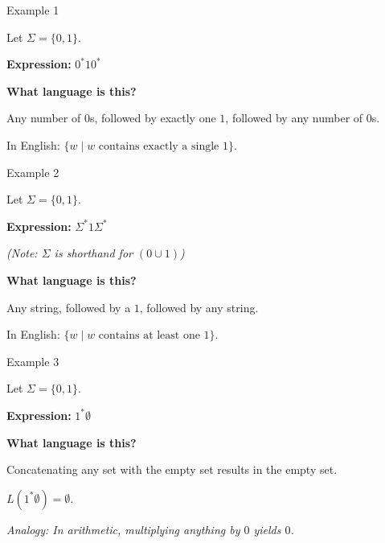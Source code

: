 \documentclass[10pt,aspectratio=169]{beamer}
\begin{document}
\begin{frame}{Example 1}

Let $\Sigma = \{0, 1\}$.

\vspace{1em}

\textbf{Expression:} $0^* 1 0^*$

\vspace{1em}

\textbf{What language is this?}

\pause
\vspace{0.5em}
Any number of $0$s, followed by exactly one $1$, followed by any number of $0$s.

\vspace{1em}
In English: $\{w \mid w \text{ contains exactly a single } 1\}$.

\end{frame}

\begin{frame}{Example 2}

Let $\Sigma = \{0, 1\}$.

\vspace{1em}

\textbf{Expression:} $\Sigma^* 1 \Sigma^*$

\textit{(Note: $\Sigma$ is shorthand for $(0 \cup 1)$)}

\vspace{1em}

\textbf{What language is this?}

\pause
\vspace{0.5em}
Any string, followed by a $1$, followed by any string.

\vspace{1em}
In English: $\{w \mid w \text{ contains at least one } 1\}$.

\end{frame}

\begin{frame}{Example 3}

Let $\Sigma = \{0, 1\}$.

\vspace{1em}

\textbf{Expression:} $1^* \emptyset$

\vspace{1em}

\textbf{What language is this?}

\pause
\vspace{0.5em}
Concatenating any set with the empty set results in the empty set.

\vspace{1em}
$L(1^* \emptyset) = \emptyset$.

\vspace{1em}
\textit{Analogy: In arithmetic, multiplying anything by $0$ yields $0$.}

\end{frame}
\end{document}
